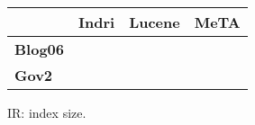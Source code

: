 \begin{figure}[t]
\centering
{\small
\begin{tabular}{|l|r|r|r|}
    \hline & \textbf{Indri} & \textbf{Lucene} & \textbf{MeTA} \\
    \hline
    \textbf{Blog06} & & & \\
    \textbf{Gov2} & & & \\
    \hline
\end{tabular}
}
\caption{IR: index size.}
\label{fig:ir-index-size}
\end{figure}
